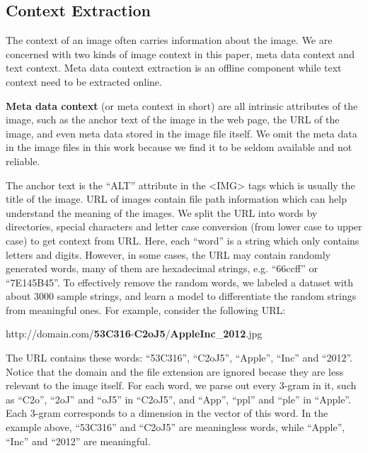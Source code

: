 \subsection{Context Extraction}
\label{sec:context}
The context of an image often carries information about the image. We
are concerned with two kinds of image context in this paper, meta data context
and text context. Meta data context extraction is an offline component while
text context need to be extracted online.

\textbf{Meta data context} (or meta context in short)
are all intrinsic attributes of the image, such as the anchor text of
the image in the web page, the URL of the image, and even meta data stored
in the image file itself. We omit the meta data in the image files in this work
because we find it to be seldom available and not reliable.

The anchor text is the ``ALT'' attribute in the <IMG> tags which is usually
the title of the image. URL of images contain file path information which
can help understand the meaning of the images.
We split the URL into words by directories,
special characters and letter case conversion (from lower case to upper case)
to get context from URL.
Here, each ``word'' is a string which only contains letters and digits.
However, in some cases, the URL may contain randomly generated
words, many of them are hexadecimal strings, e.g. ``66ccff'' or ``7E145B45''.
To effectively remove the random words,
we labeled a dataset with about 3000 sample strings,
and learn a model to differentiate the random strings from meaningful ones.
For example, consider the following URL:

\smallskip

http://domain.com/\textbf{53C316}-\textbf{C2oJ5}/\textbf{AppleInc}\_\textbf{2012}.jpg

\smallskip

The URL contains these words: ``53C316'', ``C2oJ5'', ``Apple'',
``Inc'' and ``2012''.
Notice that the domain and the file extension are ignored becase they are less
relevant to the image itself.
For each word, we parse out every 3-gram in it, such as
``C2o'', ``2oJ'' and ``oJ5'' in ``C2oJ5'',
and ``App'', ``ppl'' and ``ple'' in ``Apple''.
Each 3-gram corresponds to a dimension in the vector of this word.
In the example above, ``53C316'' and ``C2oJ5'' are meaningless words,
while ``Apple'', ``Inc'' and ``2012'' are meaningful.

